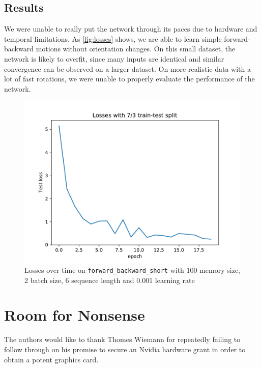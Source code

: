 \documentclass[a4paper,11pt]{article}
\begin{document}
\subsection{Results}
\label{sec:evaluation:results}

We were unable to really put the network through its paces due to hardware and
temporal limitations. As \autoref{fig:losses} shows, we are able to learn simple
forward-backward motions without orientation changes. On this small dataset, the
network is likely to overfit, since many inputs are identical and similar convergence can be
observed on a larger dataset. On more realistic data with a lot of fast
rotations, we were unable to properly evaluate the performance of the network.

\begin{figure}
    \centering
    \includegraphics[width=0.8\linewidth]{losses.pdf}
    \caption{Losses over time on \texttt{forward\_backward\_short} with 100
    memory size, 2 batch size, 6 sequence length and 0.001 learning rate}
    \label{fig:losses}
\end{figure}

\section{Room for Nonsense}
\label{sec:nonsense}
The authors would like to thank Thomes Wiemann for repeatedly failing to follow
through on his promise to secure an Nvidia hardware grant in order to obtain a
potent graphics card.


\newpage
\printbibliography
\end{document}
